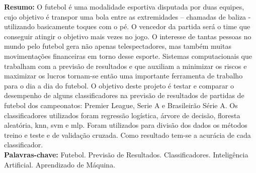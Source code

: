 \begin{singlespace}
\textbf{Resumo: }
O futebol é uma modalidade esportiva disputada por duas equipes, cujo objetivo é transpor uma bola entre as
extremidades – chamadas de baliza - utilizando basicamente toques com o pé. O vencedor da partida será o time que conseguir atingir o objetivo mais vezes no jogo. O interesse de tantas pessoas no mundo pelo futebol gera não apenas telespectadores, mas também muitas movimentações financeiras em torno desse esporte. Sistemas computacionais que trabalham com a previsão de resultados e que auxiliam a minimizar os riscos e maximizar os lucros tornam-se então uma importante ferramenta de trabalho para o dia a dia do futebol. O objetivo deste projeto é testar e comparar o desempenho de alguns classificadores na previsão de resultados de partidas de futebol dos campeonatos: Premier League, Serie A e Brasileirão Série A. Os classificadores utilizados foram regressão logística, árvore de decisão, floresta aleatória, knn, svm e mlp. Foram utilizados para divisão dos dados os métodos treino e teste e de validação cruzada. Como resultado tem-se a acurácia de cada classificador.\\
\textbf{Palavras-chave: }
Futebol. Previsão de Resultados. Classificadores. Inteligência Artificial. Aprendizado de Máquina.
\end{singlespace}